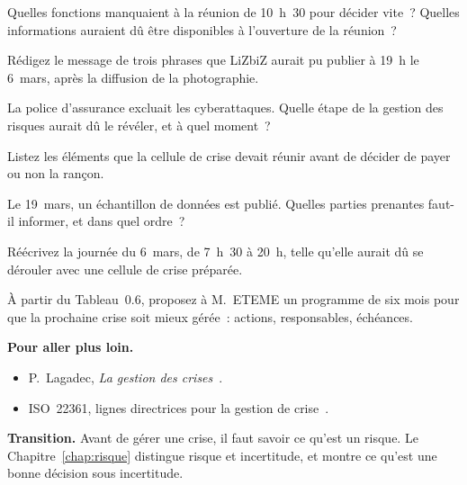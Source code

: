 \begin{boxexo}[title={\ding{45}\quad Exercice~0.4. Les absents \niveaumoyen}]
Quelles fonctions manquaient à la réunion de 10~h~30 pour décider vite~?
Quelles informations auraient dû être disponibles à l'ouverture de la
réunion~?
\end{boxexo}

\begin{boxexo}[title={\ding{45}\quad Exercice~0.5. Le message \niveaumoyen}]
Rédigez le message de trois phrases que LiZbiZ aurait pu publier à
19~h le 6~mars, après la diffusion de la photographie.
\end{boxexo}

\begin{boxexo}[title={\ding{45}\quad Exercice~0.6. L'assurance \niveaumoyen}]
La police d'assurance excluait les cyberattaques. Quelle étape de la
gestion des risques aurait dû le révéler, et à quel moment~?
\end{boxexo}

\begin{boxexo}[title={\ding{45}\quad Exercice~0.7. La rançon \niveaumoyen}]
Listez les éléments que la cellule de crise devait réunir avant de
décider de payer ou non la rançon.
\end{boxexo}

\begin{boxexo}[title={\ding{45}\quad Exercice~0.8. La seconde vague \niveaumoyen}]
Le 19~mars, un échantillon de données est publié. Quelles parties
prenantes faut-il informer, et dans quel ordre~?
\end{boxexo}

\begin{boxexo}[title={\ding{45}\quad Exercice~0.9. La chronologie idéale \niveauexpert}]
Réécrivez la journée du 6~mars, de 7~h~30 à 20~h, telle qu'elle aurait dû
se dérouler avec une cellule de crise préparée.
\end{boxexo}

\begin{boxexo}[title={\ding{45}\quad Exercice~0.10. Le programme \niveauexpert}]
À partir du Tableau~0.6, proposez à M.~ETEME un programme de six mois
pour que la prochaine crise soit mieux gérée~: actions, responsables,
échéances.
\end{boxexo}

\bigskip

\begin{boxinfo}
\textbf{Pour aller plus loin.}
\begin{itemize}
    \item P.~Lagadec, \emph{La gestion des crises}~\cite{lagadec1991}.
    \item ISO~22361, lignes directrices pour la gestion de
          crise~\cite{iso22361_2022}.
\end{itemize}
\end{boxinfo}

\begin{boxinfo}
\textbf{Transition.} Avant de gérer une crise, il faut savoir ce qu'est un
risque. Le Chapitre~\ref{chap:risque} distingue risque et incertitude, et
montre ce qu'est une bonne décision sous incertitude.
\end{boxinfo}
